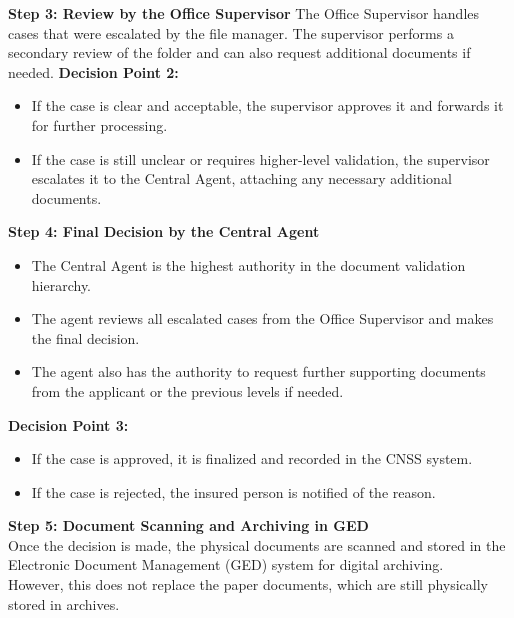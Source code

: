 \textbf{ Step 3: Review by the Office Supervisor}
The Office Supervisor handles cases that were escalated by the file manager.
The supervisor performs a secondary review of the folder and can also request additional documents if needed.
\textbf{Decision Point 2:}
\begin{itemize}
    \item If the case is clear and acceptable, the supervisor approves it and forwards it for further processing.
    \item If the case is still unclear or requires higher-level validation, the supervisor escalates it to the Central Agent, attaching any necessary additional documents.
\end{itemize}
 \textbf{ Step 4: Final Decision by the Central Agent}
\begin{itemize}
    \item The Central Agent is the highest authority in the document validation hierarchy.
    \item The agent reviews all escalated cases from the Office Supervisor and makes the final decision.
    \item The agent also has the authority to request further supporting documents from the applicant or the previous levels if needed.
\end{itemize}
\textbf{Decision Point 3:}
\begin{itemize}
    \item If the case is approved, it is finalized and recorded in the CNSS system.
    \item If the case is rejected, the insured person is notified of the reason.
\end{itemize}

\textbf{ Step 5: Document Scanning and Archiving in GED}\\
Once the decision is made, the physical documents are scanned and stored in the Electronic Document Management (GED) system for digital archiving.\\
However, this does not replace the paper documents, which are still physically stored in archives.

